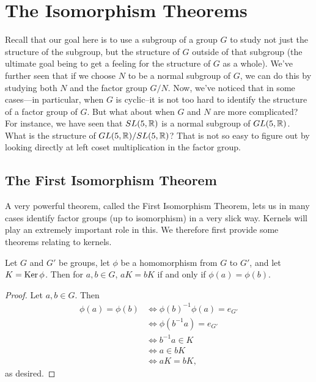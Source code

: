 \chapter{The Isomorphism Theorems}\label{isothms}%

Recall that our goal here is to use a subgroup of a group $G$ to
study not just the structure of the subgroup, but the structure of
$G$ outside of that subgroup (the ultimate goal being to get a
feeling for the structure of $G$ as a whole). We've further seen
that if we choose $N$ to be a normal subgroup of $G$, we can do this
by studying both $N$ and the factor group $G/N$.  Now, we've noticed
that in some cases---in particular, when $G$ is cyclic--it is not
too hard to identify the structure of a factor group of $G$. But
what about when $G$ and $N$ are more complicated? For instance, we
have seen that $SL(5,\mathbb{R})$ is a normal subgroup of $GL(5,\mathbb{R})$.
What is the structure of $GL(5,\mathbb{R})/SL(5,\mathbb{R})$?  That is not so
easy to figure out by looking directly at left coset multiplication
in the factor group.

\section{The First Isomorphism Theorem} A very powerful theorem, called the First Isomorphism
Theorem, lets us in many cases identify factor groups (up to
isomorphism) in a very slick way. Kernels will play an extremely
important role in this. We
 therefore first provide some theorems relating to kernels.

 \begin{thm}\label{kermean} Let $G$ and $G'$ be groups, let $\phi$ be a
 homomorphism from $G$ to $G'$, and let $K=\operatorname{Ker} \phi$.  Then for
 $a,b\in G$, $aK=bK$ if and only if $\phi(a)=\phi(b)$.
 \end{thm}

 \begin{proof} Let $a,b\in G$.  Then
 \begin{align*}\phi(a)=\phi(b)&\Leftrightarrow
 \phi(b)^{-1}\phi(a)=e_{G'}\\
&\Leftrightarrow \phi(b^{-1}a)=e_{G'}\\
&\Leftrightarrow b^{-1}a\in K\\
&\Leftrightarrow a \in bK\\
&\Leftrightarrow aK=bK, \end{align*}as desired.\end{proof}

